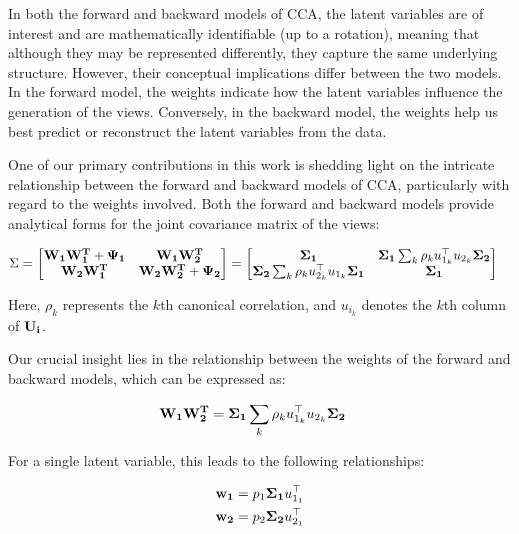 In both the forward and backward models of CCA, the latent variables are of interest and are mathematically identifiable (up to a rotation), meaning that although they may be represented differently, they capture the same underlying structure.
However, their conceptual implications differ between the two models.
In the forward model, the weights indicate how the latent variables influence the generation of the views.
Conversely, in the backward model, the weights help us best predict or reconstruct the latent variables from the data.

One of our primary contributions in this work is shedding light on the intricate relationship between the forward and backward models of CCA, particularly with regard to the weights involved.
Both the forward and backward models provide analytical forms for the joint covariance matrix of the views:

\begin{align}
    \Sigma &= \begin{bmatrix}
        \bold{W_1W_1^T} + \bold{\Psi_1} & \bold{W_1W_2^T} \\
        \bold{W_2W_1^T} & \bold{W_2W_2^T} + \bold{\Psi_2}
    \end{bmatrix} = \begin{bmatrix}
        \bold{\Sigma_1} & \bold{\Sigma_1}\sum_k \rho_k u_{1_k}^\top u_{2_k} \bold{\Sigma_2}  \\
        \bold{\Sigma_2}\sum_k \rho_k u_{2_k}^\top u_{1_k} \bold{\Sigma_1} & \bold{\Sigma_1}
    \end{bmatrix}
\end{align}

Here, $\rho_k$ represents the $k$th canonical correlation, and $u_{i_k}$ denotes the $k$th column of $\bold{U_i}$.

Our crucial insight lies in the relationship between the weights of the forward and backward models, which can be expressed as:

\begin{align}
    \bold{W_1W_2^T} &= \bold{\Sigma_1}\sum_k \rho_k u_{1_k}^\top u_{2_k} \bold{\Sigma_2}
\end{align}

For a single latent variable, this leads to the following relationships:

\begin{align}
    \bold{w_1} &= p_1\bold{\Sigma_1} u_{1_1}^\top \\
    \bold{w_2} &= p_2\bold{\Sigma_2} u_{2_1}^\top
\end{align}

